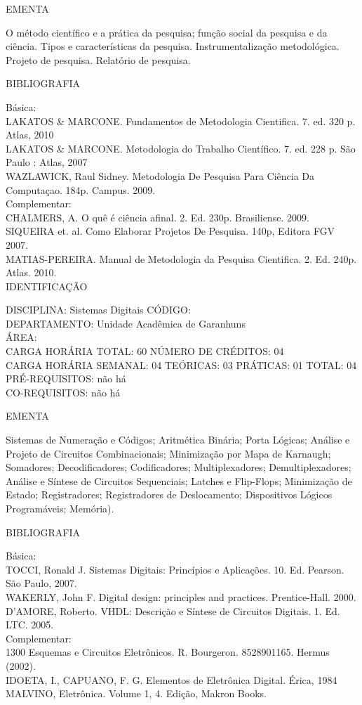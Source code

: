 \documentclass[
	12pt,				%
	openright,			%
  oneside,     %
	a4paper,			%
	english,			%
	french,				%
	spanish,			%
	brazil				%
	]{abntex2}
\begin{document}
\begin{apendicesenv}
EMENTA 

O método científico e a prática da pesquisa; função social da pesquisa e
da ciência. Tipos e características da pesquisa. Instrumentalização
metodológica. Projeto de pesquisa. Relatório de pesquisa.

BIBLIOGRAFIA 

Básica:\\
LAKATOS \& MARCONE. Fundamentos de Metodologia Cientifica. 7. ed. 320 p.
Atlas, 2010\\
LAKATOS \& MARCONE. Metodologia do Trabalho Científico. 7. ed. 228 p.
São Paulo : Atlas, 2007\\
WAZLAWICK, Raul Sidney. Metodologia De Pesquisa Para Ciência Da
Computaçao. 184p. Campus. 2009.\\
Complementar:\\
CHALMERS, A. O quê é ciência afinal. 2. Ed. 230p. Brasiliense. 2009.\\
SIQUEIRA et. al. Como Elaborar Projetos De Pesquisa. 140p, Editora FGV
2007.\\
MATIAS-PEREIRA. Manual de Metodologia da Pesquisa Cientifica. 2. Ed.
240p. Atlas. 2010.\\

\newpage IDENTIFICAÇÃO

DISCIPLINA: Sistemas Digitais CÓDIGO:\\ 
DEPARTAMENTO: Unidade Acadêmica de Garanhuns\\
ÁREA: \\
CARGA HORÁRIA TOTAL: 60 NÚMERO DE CRÉDITOS: 04\\
CARGA HORÁRIA SEMANAL: 04 TEÓRICAS: 03 PRÁTICAS: 01 TOTAL: 04\\
PRÉ-REQUISITOS: não há\\
CO-REQUISITOS: não há

EMENTA 

Sistemas de Numeração e Códigos; Aritmética Binária; Porta Lógicas;
Análise e Projeto de Circuitos Combinacionais; Minimização por Mapa de
Karnaugh; Somadores; Decodificadores; Codificadores; Multiplexadores;
Demultiplexadores; Análise e Síntese de Circuitos Sequenciais; Latches
e Flip-Flops; Minimização de Estado; Registradores; Registradores de
Deslocamento; Dispositivos Lógicos Programáveis; Memória).

BIBLIOGRAFIA 

Básica:\\
TOCCI, Ronald J. Sistemas Digitais: Princípios e Aplicações. 10. Ed.
Pearson. São Paulo, 2007.\\
WAKERLY, John F. Digital design: principles and practices.
Prentice-Hall. 2000. D'AMORE, Roberto. VHDL: Descrição
e Síntese de Circuitos Digitais. 1. Ed. LTC. 2005.\\
Complementar:\\
1300 Esquemas e Circuitos Eletrônicos. R. Bourgeron. 8528901165. Hermus
(2002).\\
IDOETA, I., CAPUANO, F. G. Elementos de Eletrônica Digital. Érica, 1984\\
MALVINO, Eletrônica. Volume 1, 4. Edição, Makron Books.\\



\end{apendicesenv}
\end{document}
